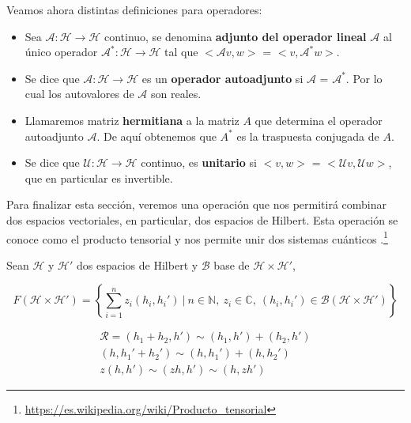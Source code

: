 \newpage

Veamos ahora distintas definiciones para operadores:
\begin{itemize}
    \item Sea $\mathscr{A}:\mathscr{H} \rightarrow \mathscr{H}$ continuo, se denomina \textbf{adjunto del operador lineal} $\mathscr{A}$ al único operador   $\mathscr{A}^{*}:\mathscr{H} \rightarrow \mathscr{H}$ tal que $<\mathscr{A}v,w>$ = $<v,\mathscr{A}^{*}w>$.
    \item Se dice que $\mathscr{A}:\mathscr{H} \rightarrow \mathscr{H}$ es un \textbf{operador autoadjunto} si $\mathscr{A}$ = $\mathscr{A}^{*}$. Por lo cual los autovalores de $\mathscr{A}$ son reales.
    \item Llamaremos matriz \textbf{hermitiana} a la matriz $A$ que determina el operador autoadjunto $\mathscr{A}$. De aquí obtenemos que $A^{*}$ es la traspuesta conjugada de $A$.
    \item Se dice que $\mathscr{U}:\mathscr{H} \rightarrow \mathscr{H}$  continuo, es \textbf{unitario} si $<v,w>$ = $<\mathscr{U}v,\mathscr{U}w>$, que en particular es invertible.
\end{itemize}

\vspace{5pt}

Para finalizar esta sección, veremos una operación que nos permitirá combinar dos espacios vectoriales, en particular, dos espacios de Hilbert. Esta operación se conoce como el producto tensorial y nos permite unir dos sistemas cuánticos \cite{B:Nielsen:2002}.\footnote{\url{https://es.wikipedia.org/wiki/Producto_tensorial}}

\vspace{10pt}

Sean $\mathscr{H}$ y $\mathscr{H}'$ dos espacios de Hilbert y $\mathscr{B}$ base de $\mathscr{H} \times \mathscr{H}'$,

\vspace{5pt}
\begin{equation}
    F(\mathscr{H} \times \mathscr{H}') = \left\lbrace \sum_{i=1}^{n}z_{i} (h_{i},h_{i}')\:|\:n \in \mathbb{N},\: z_{i} \in \mathbb{C},\:(h_{i},h_{i}') \in \mathscr{B}(\mathscr{H} \times \mathscr{H}') \right\rbrace
\end{equation}

\vspace{5pt}
\begin{equation}
\begin{split}
    \mathscr{R} =  (h_{1}+h_{2},h') \sim (h_{1},h') + (h_{2},h') \\ 
    (h,h_{1}'+h_{2}') \sim (h,h_{1}') + (h,h_{2}') \\
    z(h,h') \sim (z h,h') \sim (h,z h')
\end{split}
\end{equation}

